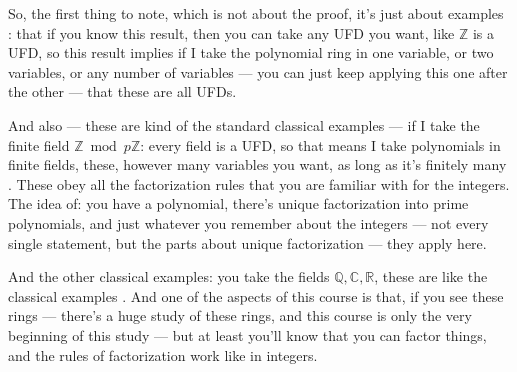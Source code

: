 \begin{speech}[00:00:47 - 00:02:16]
So, the first thing to note, which is not about the proof, it's just about examples : that if you know this result, then you can take any UFD you want, like $\mathbb{Z}$ is a UFD, so this result implies if I take the polynomial ring in one variable, or two variables, or any number of variables  --- you can just keep applying this one after the other  --- that these are all UFDs.

And also --- these are kind of the standard classical examples --- if I take the finite field $\mathbb{Z} \bmod p\mathbb{Z}$: every field is a UFD, so that means I take polynomials in finite fields, these, however many variables you want, as long as it's finitely many . These obey all the factorization rules that you are familiar with for the integers. The idea of: you have a polynomial, there's unique factorization into prime polynomials, and just whatever you remember about the integers --- not every single statement, but the parts about unique factorization --- they apply here.

And the other classical examples: you take the fields $\mathbb{Q}, \mathbb{C}, \mathbb{R}$, these are like the classical examples . And one of the aspects of this course is that, if you see these rings --- there's a huge study of these rings, and this course is only the very beginning of this study --- but at least you'll know that you can factor things, and the rules of factorization work like in integers.
\end{speech}

